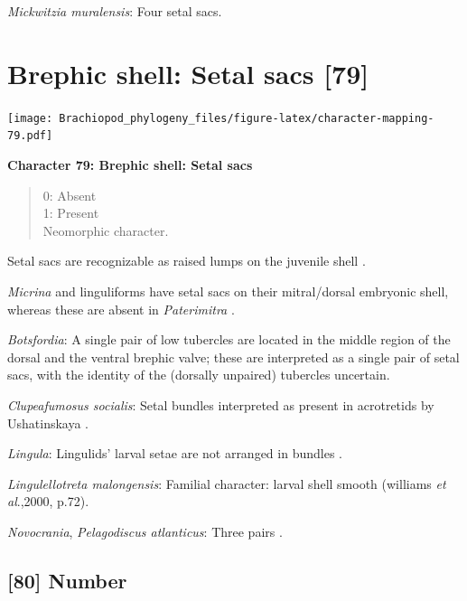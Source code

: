 \documentclass[openany]{book}
\theoremstyle{definition}
\theoremstyle{definition}
\theoremstyle{definition}
\theoremstyle{remark}
\begin{document}
\hypertarget{Mickwitzia_muralensis-coding-78}{}
\emph{Mickwitzia muralensis}: Four setal sacs.

\section{Brephic shell: Setal sacs
{[}79{]}}\label{brephic-shell-setal-sacs-79}

\texttt{[image: Brachiopod\_phylogeny\_files/figure-latex/character-mapping-79.pdf]}

\textbf{Character 79: Brephic shell: Setal sacs}

\begin{quote}
0: Absent\\
1: Present\\
Neomorphic character.
\end{quote}

Setal sacs are recognizable as raised lumps on the juvenile shell
\citep[see][]{Bassett2017Earliestontogeny}.

\emph{Micrina} and linguliforms have setal sacs on their mitral/dorsal
embryonic shell, whereas these are absent in \emph{Paterimitra}
\citep{Holmer2011Firstrecord}.

\hypertarget{Botsfordia-coding-79}{}
\emph{Botsfordia}: A single pair of low tubercles are \citep[ state
``may be'']{Ushatinskaya2016Revisionof} located in the middle region of
the dorsal and the ventral brephic valve; these are interpreted as a
single pair of setal sacs, with the identity of the (dorsally unpaired)
tubercles uncertain.

\hypertarget{Clupeafumosus_socialis-coding-79}{}
\emph{Clupeafumosus socialis}: Setal bundles interpreted as present in
acrotretids by Ushatinskaya \citeyearpar{Ushatinskaya2016Protegulumand}.

\hypertarget{Lingula-coding-79}{}
\emph{Lingula}: Lingulids' larval setae are not arranged in bundles
\citep{Carlson1995Phylogeneticrelationships}.

\hypertarget{Lingulellotreta_malongensis-coding-79}{}
\emph{Lingulellotreta malongensis}: Familial character: larval shell
smooth (williams \emph{et al}.,2000, p.72).

\hypertarget{Novocrania-coding-79}{}
\emph{Novocrania}, \emph{Pelagodiscus atlanticus}: Three pairs
\citep{Carlson1995Phylogeneticrelationships}.

\subsection*{{[}80{]} Number}\label{number}
\end{document}
